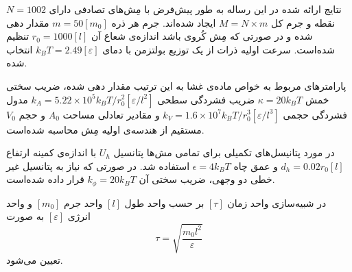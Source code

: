 نتایج ارائه شده در این رساله  به طور پیش‌فرض با مِش‌های تصادفی دارای 
$N=1002$
نقطه و جرم کل
$M=N\times m$
ایجاد شده‌اند. جرم هر ذره 
$m=50 [m_0]$
مقدار دهی شده و در صورتی که مِش کُروی باشد اندازه‌ی شعاع آن 
$r_0=1000 [l]$
تنظیم شده‌است. سرعت اولیه ذرات از یک توزیع بولتزمن با دمای 
$k_BT=2.49 [\varepsilon]$
انتخاب شده.

پارامترهای مربوط به خواص ماده‌ی غشا به این ترتیب مقدار دهی شده، ضریب سختی خمش 
$\kappa =20k_BT$
ضریب فشردگی سطحی
$k_A=5.22\times10^{5}k_BT/r_0^2 [\varepsilon/l^2]$
مدول فشردگی حجمی
$k_V=1.6\times10^7k_BT/r_0^3 [\varepsilon/l^3]$
و مقادیر تعادلی مساحت
$A_0$
و حجم
$V_0$
مستقیم از هندسه‌ی اولیه مِش محاسبه‌ شده‌است. 

در مورد پتانیسل‌های تکمیلی برای تمامی مش‌ها پتانسیل 
$U_h$
با اندازه‌ی کمینه ارتفاع 
$d_h=0.02r_0 [l]$
و عمق چاه
$\epsilon=4k_BT$
استفاده شد. در صورتی که نیاز به پتانسیل غیر خطی دو وجهی، ضریب سختی آن 
$k_{\phi}=20k_BT$
قرار داده شده‌است.

در شبیه‌سازی واحد زمان
$[\tau]$
بر حسب واحد طول 
$[l]$
واحد جرم
$[m_0]$
و واحد انرژی
$[\varepsilon]$
به صورت
\begin{equation}
\tau =\sqrt{\frac{m_0l^2}{\varepsilon}}
\end{equation}
تعیین می‌شود.









